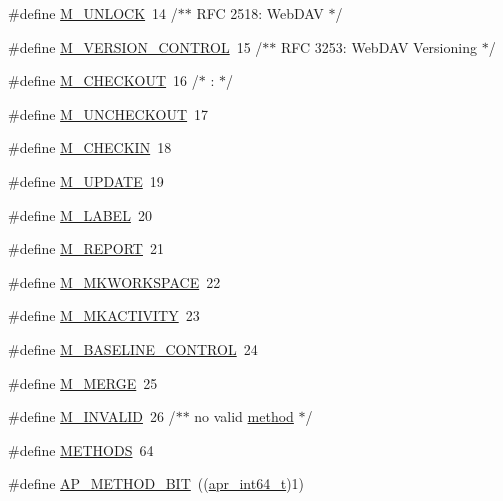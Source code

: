 \begin{DoxyCompactItemize}
\item 
\#define \hyperlink{group__Methods_gaada2a011bd593a1312d11bb15493e8bf}{M\+\_\+\+U\+N\+L\+O\+CK}~14      /$\ast$$\ast$ R\+FC 2518\+: Web\+D\+AV $\ast$/
\item 
\#define \hyperlink{group__Methods_ga3b5980ed972a6d8bf11f2871b1d40cf4}{M\+\_\+\+V\+E\+R\+S\+I\+O\+N\+\_\+\+C\+O\+N\+T\+R\+OL}~15      /$\ast$$\ast$ R\+FC 3253\+: Web\+D\+AV Versioning $\ast$/
\item 
\#define \hyperlink{group__Methods_ga3d53f0f6b8d26b790573cfa82bd9021c}{M\+\_\+\+C\+H\+E\+C\+K\+O\+UT}~16      /$\ast$  \+:                          $\ast$/
\item 
\#define \hyperlink{group__Methods_gaf69c034cfe6caaade542f6d5064cb633}{M\+\_\+\+U\+N\+C\+H\+E\+C\+K\+O\+UT}~17
\item 
\#define \hyperlink{group__Methods_gab2cb83a1be7a597c21547596b8a30a29}{M\+\_\+\+C\+H\+E\+C\+K\+IN}~18
\item 
\#define \hyperlink{group__Methods_gab4f114c1fd5f1e1027605fd8d5acc907}{M\+\_\+\+U\+P\+D\+A\+TE}~19
\item 
\#define \hyperlink{group__Methods_ga59be240e6236fa0f7c2cc1cf78f1b4a5}{M\+\_\+\+L\+A\+B\+EL}~20
\item 
\#define \hyperlink{group__Methods_gadb0db0439e55699cceb03ed44ee2100e}{M\+\_\+\+R\+E\+P\+O\+RT}~21
\item 
\#define \hyperlink{group__Methods_gaa41d152afa807ca69d28e7ea83fe43f7}{M\+\_\+\+M\+K\+W\+O\+R\+K\+S\+P\+A\+CE}~22
\item 
\#define \hyperlink{group__Methods_ga219bb3551459574081751e086fa9cc21}{M\+\_\+\+M\+K\+A\+C\+T\+I\+V\+I\+TY}~23
\item 
\#define \hyperlink{group__Methods_gab139390584b5afcd32e6b349393c0a81}{M\+\_\+\+B\+A\+S\+E\+L\+I\+N\+E\+\_\+\+C\+O\+N\+T\+R\+OL}~24
\item 
\#define \hyperlink{group__Methods_gab4087b38042f95153e145b0db37df9df}{M\+\_\+\+M\+E\+R\+GE}~25
\item 
\#define \hyperlink{group__Methods_gacc2a55b9810a0a140a6cfb53ab0baa36}{M\+\_\+\+I\+N\+V\+A\+L\+ID}~26      /$\ast$$\ast$ no valid \hyperlink{ab_8c_a77deaf9d3339f8d07d067fa3c685023e}{method} $\ast$/
\item 
\#define \hyperlink{group__Methods_ga450901c43a43e4dd81eba1e9e229d3a1}{M\+E\+T\+H\+O\+DS}~64
\item 
\#define \hyperlink{group__Methods_ga2c2414cfae1856a90350b3fba8a6dde9}{A\+P\+\_\+\+M\+E\+T\+H\+O\+D\+\_\+\+B\+IT}~((\hyperlink{group__apr__platform_ga4b75afbf973dc6c8aea4ae75b044aa08}{apr\+\_\+int64\+\_\+t})1)
\end{DoxyCompactItemize}


